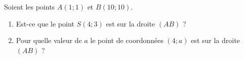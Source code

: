 
\begin{exercice}\label{exosmath-0618}

    Soient les points \( A(1;1)\) et \( B(10;10)\).

    \begin{enumerate}
        \item
            Est-ce que le point \( S(4;3)\) est sur la droite \( (AB)\) ?
        \item
            Pour quelle valeur de \( a\) le point de coordonnées \( (4;a)\) est sur la droite \( (AB)\) ?
    \end{enumerate}

\end{exercice}
